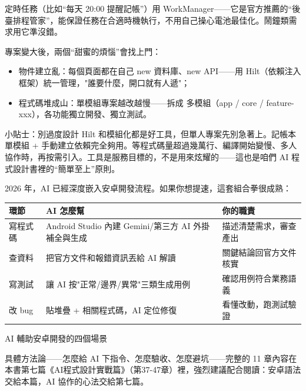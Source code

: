定時任務（比如“每天 20:00 提醒記帳”）用 WorkManager——它是官方推薦的“後臺排程管家”，能保證任務在合適時機執行，不用自己操心電池最佳化。鬧鐘類需求用它準沒錯。


專案變大後，兩個“甜蜜的煩惱”會找上門：

\begin{itemize}
  \item 物件建立亂：每個頁面都在自己 new 資料庫、new API——用 Hilt（依賴注入框架）統一管理，"誰要什麼，開口就有人遞"；
  \item 程式碼堆成山：單模組專案越改越慢——拆成 多模組（app / core / feature-xxx），各功能獨立開發、獨立測試。
\end{itemize}

\begin{tcbinfo}{小貼士：別過度設計}
Hilt 和模組化都是好工具，但單人專案先別急著上。記帳本單模組 + 手動建立依賴完全夠用。等程式碼量超過幾萬行、編譯開始變慢、多人協作時，再按需引入。工具是服務目標的，不是用來炫耀的——這也是咱們 AI 程式設計書裡的“簡單至上”原則。

\end{tcbinfo}


2026 年，AI 已經深度嵌入安卓開發流程。如果你想提速，這套組合拳很成熟：

\begin{center}
\begin{tabularx}{\linewidth}{|X|X|X|}
\hline
\textbf{環節} & \textbf{AI 怎麼幫} & \textbf{你的職責} \tabularnewline
\hline
寫程式碼 & Android Studio 內建 Gemini/第三方 AI 外掛補全與生成 & 描述清楚需求，審查產出 \tabularnewline
查資料 & 把官方文件和報錯資訊丟給 AI 解讀 & 關鍵結論回官方文件核實 \tabularnewline
寫測試 & 讓 AI 按"正常/邊界/異常"三類生成用例 & 確認用例符合業務語義 \tabularnewline
改 bug & 貼堆疊 + 相關程式碼，AI 定位修復 & 看懂改動，跑測試驗證 \tabularnewline
\hline
\end{tabularx}
\end{center}

\begin{center}\small\color{gray}AI 輔助安卓開發的四個場景\end{center}

具體方法論——怎麼給 AI 下指令、怎麼驗收、怎麼避坑——完整的 11 章內容在本書第七篇《AI程式設計實戰篇》（第37-47章）裡，強烈建議配合閱讀：安卓語法交給本篇，AI 協作的心法交給第七篇。


